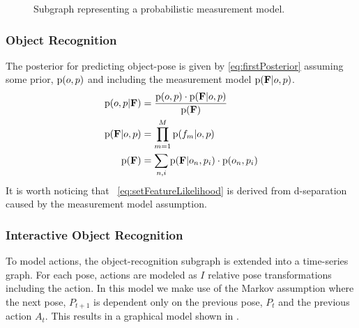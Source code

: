            \begin{figure}[h]
              \centering
              \caption{Subgraph representing a probabilistic measurement model.}
              \label{fig:objectRecognitionSubgraph}
            \end{figure}


 
\subsubsection{Object Recognition}            
            The posterior for predicting object-pose is given by \eqref{eq:firstPosterior} assuming some prior, $\text{p}(o,p)$ and including the measurement model $\text{p}(\mathbf{F}|o,p)$.
            \begin{align}
                \label{eq:firstPosterior}
                \prob{o,p|\set{F}} &= \frac{\prob{o,p} \cdot \prob{\set{F}|o,p}}{\prob{\set{F}}}\\
                \label{eq:setFeatureLikelihood}
                \prob{\set{F}|o,p} &= \prod_{m=1}^{M} \prob{f_m|o,p}\\
                \label{eq:setFeatureEvidence}
                \prob{\set{F}} &= \sum_{n,i} \prob{\set{F}|o_n,p_i}\cdot \prob{o_n,p_i}
            \end{align}
It is worth noticing that ~\eqref{eq:setFeatureLikelihood} is derived from d-separation caused by the measurement model assumption.

        \subsubsection{Interactive Object Recognition}
            To model actions, the object-recognition subgraph is extended into a time-series graph. For each pose, actions are modeled as $I$ relative pose transformations including the  action. In this model we make use of the Markov assumption where the next pose, $P_{t+1}$ is dependent only on the previous pose, $P_t$ and the previous action $A_t$. This results in a graphical model shown in .
            
